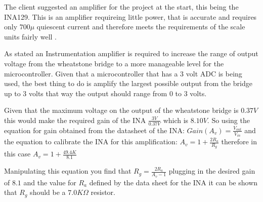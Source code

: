 

The client suggested an amplifier for the project at the start, this being the INA129. This is an amplifier requireing little power, that is accurate and requires only $700\mu$ quiescent current \cite{ina} and therefore meets the requirements of the scale units fairly well .

As stated an Instrumentation amplifier is required to increase the range of output voltage from the wheatstone bridge to a more manageable level for the microcontroller. Given that a microcontroller that has a $3$ volt ADC is being used, the best thing to do is amplify the largest possible output from the bridge up to $3$ volts that way the output should range from $0$ to $3$ volts. 

Given that the maximum voltage on the output of the wheatstone bridge is $0.37V$ this would make the required gain of the INA $\frac{3V}{0.37V}$ which is $8.10V$. So using the equation for gain obtained from the datasheet of the INA: \(Gain(A_{v}) = \frac{V_{out}}{V_{in}}\) and the equation to calibrate the INA for this amplification: 
$A_v = 1 + \frac{2R_a}{R_g}$ therefore in this case $A_v = 1 + \frac{49.4K}{8.1}$

Manipulating this equation you find that $R_g = \frac{2R_a}{A_v - 1}$ plugging in the desired gain of $8.1$ and the value for $R_a$ defined by the data sheet for the INA it can be shown that $R_g$ should be a $7.0K\Omega$ resistor. 
